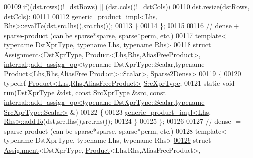 \begin{DoxyCode}
00109     \textcolor{keywordflow}{if}((dst.rows()!=dstRows) || (dst.cols()!=dstCols))
00110       dst.resize(dstRows, dstCols);
00111     
00112     \hyperlink{struct_eigen_1_1internal_1_1generic__product__impl}{generic\_product\_impl<Lhs, Rhs>::evalTo}(dst,src.lhs(),src.rhs());
00113   \}
00114 \};
00115 
00116 \textcolor{comment}{// dense += sparse-product (can be sparse*sparse, sparse*perm, etc.)}
00117 \textcolor{keyword}{template}< \textcolor{keyword}{typename} DstXprType, \textcolor{keyword}{typename} Lhs, \textcolor{keyword}{typename} Rhs>
\hyperlink{struct_eigen_1_1internal_1_1_assignment_3_01_dst_xpr_type_00_01_product_3_01_lhs_00_01_rhs_00_01829d7a1a901a0be4e54bdeda694d8781}{00118} \textcolor{keyword}{struct }\hyperlink{struct_eigen_1_1internal_1_1_assignment}{Assignment}<DstXprType, \hyperlink{group___core___module_class_eigen_1_1_product}{Product}<Lhs,Rhs,AliasFreeProduct>, 
      \hyperlink{namespaceinternal}{internal}::\hyperlink{struct_eigen_1_1internal_1_1add__assign__op}{add\_assign\_op}<typename DstXprType::Scalar,typename Product<Lhs,Rhs,AliasFree
      Product>::Scalar>, \hyperlink{struct_eigen_1_1internal_1_1_sparse2_dense}{Sparse2Dense}>
00119 \{
00120   \textcolor{keyword}{typedef} \hyperlink{group___core___module_class_eigen_1_1_product}{Product<Lhs,Rhs,AliasFreeProduct>} 
      \hyperlink{group___core___module_class_eigen_1_1_product}{SrcXprType};
00121   \textcolor{keyword}{static} \textcolor{keywordtype}{void} run(DstXprType &dst, \textcolor{keyword}{const} SrcXprType &src, \textcolor{keyword}{const} 
      \hyperlink{struct_eigen_1_1internal_1_1add__assign__op}{internal::add\_assign\_op<typename DstXprType::Scalar,typename SrcXprType::Scalar>}
       &)
00122   \{
00123     \hyperlink{struct_eigen_1_1internal_1_1generic__product__impl}{generic\_product\_impl<Lhs, Rhs>::addTo}(dst,src.lhs(),src.rhs());
00124   \}
00125 \};
00126 
00127 \textcolor{comment}{// dense -= sparse-product (can be sparse*sparse, sparse*perm, etc.)}
00128 \textcolor{keyword}{template}< \textcolor{keyword}{typename} DstXprType, \textcolor{keyword}{typename} Lhs, \textcolor{keyword}{typename} Rhs>
\hyperlink{struct_eigen_1_1internal_1_1_assignment_3_01_dst_xpr_type_00_01_product_3_01_lhs_00_01_rhs_00_014697dd90e96dca324eed00088adc1a1c}{00129} \textcolor{keyword}{struct }\hyperlink{struct_eigen_1_1internal_1_1_assignment}{Assignment}<DstXprType, \hyperlink{group___core___module_class_eigen_1_1_product}{Product}<Lhs,Rhs,AliasFreeProduct>, 

\end{DoxyCode}
